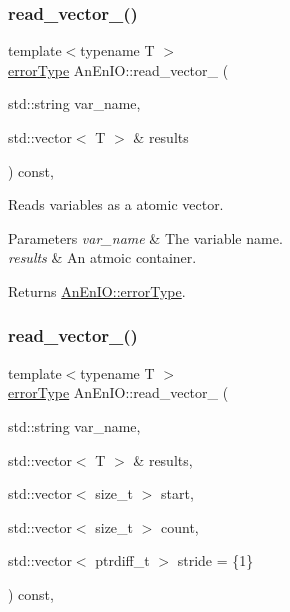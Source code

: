 \subsubsection{\texorpdfstring{read\+\_\+vector\+\_\+()}{read\_vector\_()}\hspace{0.1cm}{\footnotesize\ttfamily [1/3]}}
{\footnotesize\ttfamily template$<$typename T $>$ \\
\mbox{\hyperlink{class_an_en_i_o_aa56bc1ec6610b86db4349bce20f9ead0}{error\+Type}} An\+En\+I\+O\+::read\+\_\+vector\+\_\+ (\begin{DoxyParamCaption}\item[{std\+::string}]{var\+\_\+name,  }\item[{std\+::vector$<$ T $>$ \&}]{results }\end{DoxyParamCaption}) const\hspace{0.3cm}{\ttfamily [inline]}, {\ttfamily [protected]}}

Reads variables as a atomic vector.


\begin{DoxyParams}{Parameters}
{\em var\+\_\+name} & The variable name. \\
\hline
{\em results} & An atmoic container. \\
\hline
\end{DoxyParams}
\begin{DoxyReturn}{Returns}
\mbox{\hyperlink{class_an_en_i_o_aa56bc1ec6610b86db4349bce20f9ead0}{An\+En\+I\+O\+::error\+Type}}. 
\end{DoxyReturn}
\mbox{\label{class_an_en_i_o_a4a4b8eedb372df1bb46b2104ae2761cd}} 
\subsubsection{\texorpdfstring{read\+\_\+vector\+\_\+()}{read\_vector\_()}\hspace{0.1cm}{\footnotesize\ttfamily [2/3]}}
{\footnotesize\ttfamily template$<$typename T $>$ \\
\mbox{\hyperlink{class_an_en_i_o_aa56bc1ec6610b86db4349bce20f9ead0}{error\+Type}} An\+En\+I\+O\+::read\+\_\+vector\+\_\+ (\begin{DoxyParamCaption}\item[{std\+::string}]{var\+\_\+name,  }\item[{std\+::vector$<$ T $>$ \&}]{results,  }\item[{std\+::vector$<$ size\+\_\+t $>$}]{start,  }\item[{std\+::vector$<$ size\+\_\+t $>$}]{count,  }\item[{std\+::vector$<$ ptrdiff\+\_\+t $>$}]{stride = {\ttfamily \{1\}} }\end{DoxyParamCaption}) const\hspace{0.3cm}{\ttfamily [inline]}, {\ttfamily [protected]}}

